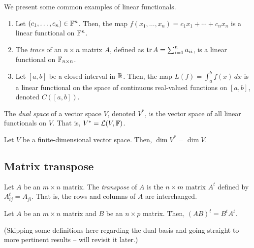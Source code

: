 \documentclass{article}
\begin{document}
\begin{example}
  We present some common examples of linear functionals.
  \begin{enumerate}
    \item Let $(c_1, \ldots, c_n) \in \mathbb{F}^n$.
          Then, the map $f(x_1, \ldots, x_n) = c_1x_1 + \cdots + c_nx_n$ is a linear functional on $\mathbb{F}^n$.
    \item The \emph{trace} of an $n \times n$ matrix $A$, defined as $\tr A = \sum_{i = 1}^n a_{ii}$, is a linear functional on $\mathbb{F}_{n \times n}$.
    \item Let $[a, b]$ be a closed interval in $\mathbb{R}$.
          Then, the map $L(f) = \int_a^b f(x) \,dx$ is a linear functional on the space of continuous real-valued functions on $[a, b]$, denoted $C([a, b])$.
  \end{enumerate}
\end{example}

\begin{definition}
  The \emph{dual space} of a vector space $V$, denoted $V^*$, is the vector space of all linear functionals on $V$.
  That is, $V^* = \mathcal{L}(V, \mathbb{F})$.
\end{definition}

\begin{theorem}[$\dim V^* = \dim V$]
  Let $V$ be a finite-dimensional vector space.
  Then, $\dim V^* = \dim V$.
\end{theorem}

\subsection{Matrix transpose}

\begin{definition}
  Let $A$ be an $m \times n$ matrix.
  The \emph{transpose} of $A$ is the $n \times m$ matrix $A^t$ defined by $A_{ij}^t = A_{ji}$.
  That is, the rows and columns of $A$ are interchanged.
\end{definition}

\begin{theorem}
  Let $A$ be an $m \times n$ matrix and $B$ be an $n \times p$ matrix.
  Then, $(AB)^t = B^tA^t$.
\end{theorem}

(Skipping some definitions here regarding the dual basis and going straight to more pertinent results -- will revisit it later.)
\end{document}
